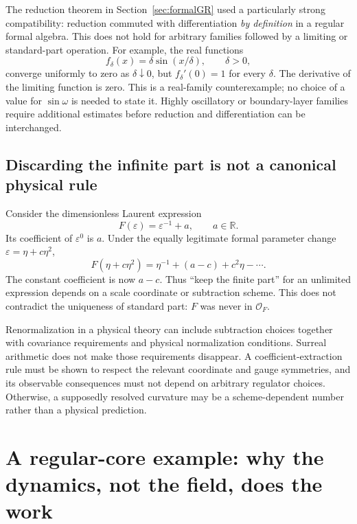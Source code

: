 \documentclass[11pt,letterpaper]{article}
\newcommand{\R}{\mathbb{R}}
\newcommand{\eps}{\varepsilon}
\theoremstyle{definition}
\theoremstyle{remark}
\begin{document}
The reduction theorem in Section~\ref{sec:formalGR} used a particularly strong
compatibility: reduction commuted with differentiation \emph{by definition} in
a regular formal algebra. This does not hold for arbitrary families followed
by a limiting or standard-part operation. For example, the real functions
\[
 f_\delta(x)=\delta\sin(x/\delta),\qquad\delta>0,
\]
converge uniformly to zero as $\delta\downarrow0$, but
$f_\delta'(0)=1$ for every $\delta$. The derivative of the limiting function
is zero. This is a real-family counterexample; no choice of a value for
$\sin\omega$ is needed to state it. Highly oscillatory or boundary-layer
families require additional estimates before reduction and differentiation
can be interchanged.

\subsection{Discarding the infinite part is not a canonical physical rule}

Consider the dimensionless Laurent expression
\[
 F(\eps)=\eps^{-1}+a,
 \qquad a\in\R.
\]
Its coefficient of $\eps^0$ is $a$. Under the equally legitimate formal
parameter change $\eps=\eta+c\eta^2$,
\begin{equation}
 F(\eta+c\eta^2)
   =\eta^{-1}+(a-c)+c^2\eta-\cdots.
 \label{eq:finitepart}
\end{equation}
The constant coefficient is now $a-c$. Thus ``keep the finite part'' for an
unlimited expression depends on a scale coordinate or subtraction scheme.
This does not contradict the uniqueness of standard part: $F$ was never in
$\mathcal O_F$.

Renormalization in a physical theory can include subtraction choices together
with covariance requirements and physical normalization conditions. Surreal
arithmetic does not make those requirements disappear. A coefficient-extraction
rule must be shown to respect the relevant coordinate and gauge symmetries,
and its observable consequences must not depend on arbitrary regulator
choices. Otherwise, a supposedly resolved curvature may be a scheme-dependent
number rather than a physical prediction.

\section{A regular-core example: why the dynamics, not the field, does the work}
\label{sec:Hayward}
\end{document}

